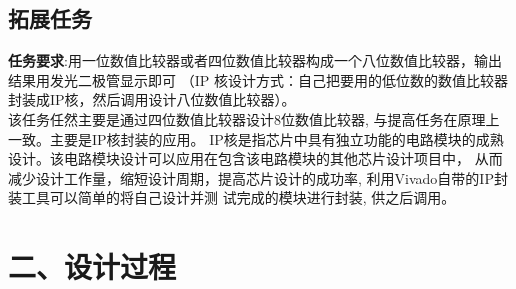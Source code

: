 \documentclass{article}
\newcommand{\fourhao}{\fontsize{14pt}{\baselineskip}\selectfont} %
\newcommand{\xiaosihao}{\fontsize{12pt}{\baselineskip}\selectfont} %
\begin{document}
\subsection*{拓展任务}
\textbf{任务要求}:用一位数值比较器或者四位数值比较器构成一个八位数值比较器，输出结果用发光二极管显示即可
（IP 核设计方式：自己把要用的低位数的数值比较器封装成IP核，然后调用设计八位数值比较器）。\\

该任务任然主要是通过四位数值比较器设计8位数值比较器, 与提高任务在原理上一致。主要是IP核封装的应用。
IP核是指芯片中具有独立功能的电路模块的成熟设计。该电路模块设计可以应用在包含该电路模块的其他芯片设计项目中，
从而减少设计工作量，缩短设计周期，提高芯片设计的成功率, 利用Vivado自带的IP封装工具可以简单的将自己设计并测
试完成的模块进行封装, 供之后调用。
\section*{\fourhao 二、设计过程}
\xiaosihao

\end{document}
